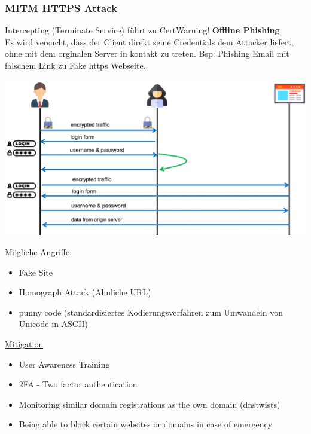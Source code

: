 \subsubsection{MITM HTTPS Attack}
Intercepting (Terminate Service) führt zu CertWarning!
\textbf{Offline Phishing}\\
Es wird versucht, dass der Client direkt seine Credentials dem Attacker liefert, ohne mit dem orginalen Server in kontakt zu treten. Bsp: Phishing Email mit falschem Link zu Fake https Webseite.
\begin{center}
    \vspace{-8pt}
    \includegraphics[width=.8\linewidth]{./img/09-mitm/fake_https_page}
    \vspace{-8pt}
\end{center}
\underline{Mögliche Angriffe:}
\begin{itemize}
    \item Fake Site
    \item Homograph Attack (Ähnliche URL)
    \item punny code (standardisiertes Kodierungsverfahren zum Umwandeln von Unicode in ASCII)
\end{itemize}
\underline{Mitigation}
\begin{itemize}
    \item User Awareness Training
    \item 2FA - Two factor authentication
    \item Monitoring similar domain registrations as the own domain (dnstwists)
    \item Being able to block certain websites or domains in case of emergency
\end{itemize}

